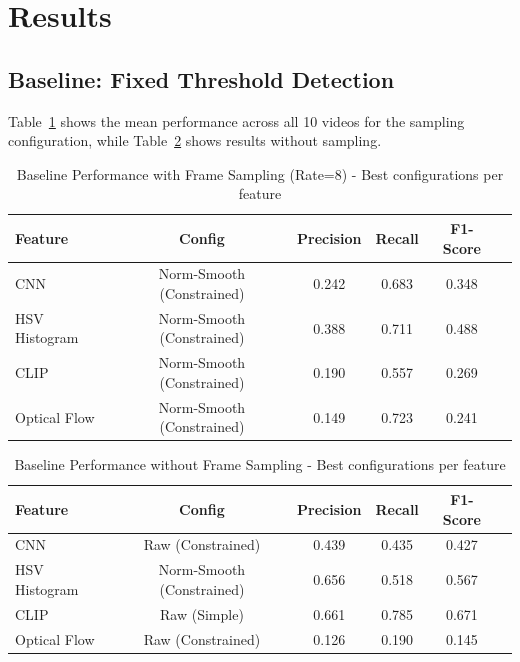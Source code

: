 \documentclass[11pt,a4paper]{article}
\begin{document}
\section{Results}

\subsection{Baseline: Fixed Threshold Detection}

Table~\ref{tab:sampling_results} shows the mean performance across all 10 videos for the sampling configuration, while Table~\ref{tab:no_sampling_results} shows results without sampling.

\begin{table}[H]
\centering
\caption{Baseline Performance with Frame Sampling (Rate=8) - Best configurations per feature}
\label{tab:sampling_results}
\small
\begin{tabular}{lccccc}
\toprule
\textbf{Feature} & \textbf{Config} & \textbf{Precision} & \textbf{Recall} & \textbf{F1-Score} \\
\midrule
CNN & Norm-Smooth (Constrained) & 0.242 & 0.683 & 0.348 \\
HSV Histogram & Norm-Smooth (Constrained) & 0.388 & 0.711 & 0.488 \\
CLIP & Norm-Smooth (Constrained) & 0.190 & 0.557 & 0.269 \\
Optical Flow & Norm-Smooth (Constrained) & 0.149 & 0.723 & 0.241 \\
\bottomrule
\end{tabular}
\end{table}

\begin{table}[H]
\centering
\caption{Baseline Performance without Frame Sampling - Best configurations per feature}
\label{tab:no_sampling_results}
\small
\begin{tabular}{lccccc}
\toprule
\textbf{Feature} & \textbf{Config} & \textbf{Precision} & \textbf{Recall} & \textbf{F1-Score} \\
\midrule
CNN & Raw (Constrained) & 0.439 & 0.435 & 0.427 \\
HSV Histogram & Norm-Smooth (Constrained) & 0.656 & 0.518 & 0.567 \\
CLIP & Raw (Simple) & 0.661 & 0.785 & 0.671 \\
Optical Flow & Raw (Constrained) & 0.126 & 0.190 & 0.145 \\
\bottomrule
\end{tabular}
\end{table}
\end{document}
